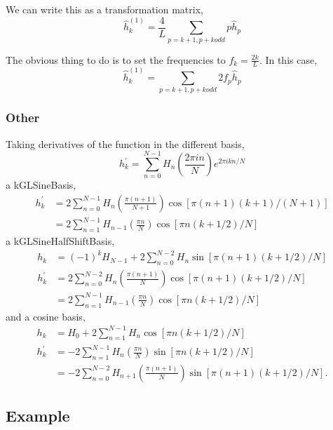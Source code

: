 \documentclass[11pt]{article}
\begin{document}
We can write this as a transformation matrix,
\begin{equation}
\hat{h}_{k}^{(1)} = \frac{4}{L} \sum_{p=k+1, p+k odd} p \hat{h}_p
\end{equation}

The obvious thing to do is to set the frequencies to $f_k = \frac{2k}{L}$. In this case,
\begin{equation}
\hat{h}_{k}^{(1)} = \sum_{p=k+1, p+k odd} 2 f_p \hat{h}_p
\end{equation}

\subsubsection{Other}
Taking derivatives of the function in the different basis,
\begin{equation}
h_k^\prime = \sum_{n=0}^{N-1} H_n \left( \frac{2 \pi i n}{N} \right) e^{2\pi i k n/N}
\end{equation}
a kGLSineBasis,
\begin{align}
h_k^\prime  &= 2 \sum_{n=0}^{N-1} H_n \left( \frac{\pi (n+1)}{N+1} \right) \cos \left[ \pi(n+1)(k+1)/(N+1)\right] \\
&= 2 \sum_{n=1}^{N-1} H_{n-1} \left( \frac{\pi n}{N} \right) \cos \left[ \pi n (k+1/2)/N\right]
\end{align}
a kGLSineHalfShiftBasis,
\begin{align}
h_k &= (-1)^k H_{N-1} + 2 \sum_{n=0}^{N-2} H_n \sin \left[ \pi(n+1)(k+1/2)/N\right] \\
h_k^\prime &=2 \sum_{n=0}^{N-2} H_n  \left( \frac{\pi (n+1)}{N} \right) \cos \left[ \pi(n+1)(k+1/2)/N\right] \\
&=2 \sum_{n=1}^{N-1} H_{n-1}  \left( \frac{\pi n}{N} \right) \cos \left[ \pi n(k+1/2)/N\right]
\end{align}
and a cosine basis,
\begin{align}
h_k &= H_{0} + 2 \sum_{n=1}^{N-1} H_n \cos \left[ \pi n(k+1/2)/N\right] \\
h_k^\prime &= - 2 \sum_{n=1}^{N-1} H_n  \left( \frac{\pi n}{N} \right) \sin \left[ \pi n(k+1/2)/N\right] \\
&= - 2 \sum_{n=0}^{N-2} H_{n+1}  \left( \frac{\pi (n+1)}{N} \right) \sin \left[ \pi (n+1)(k+1/2)/N\right].
\end{align}



\subsection{Example}
\end{document}
